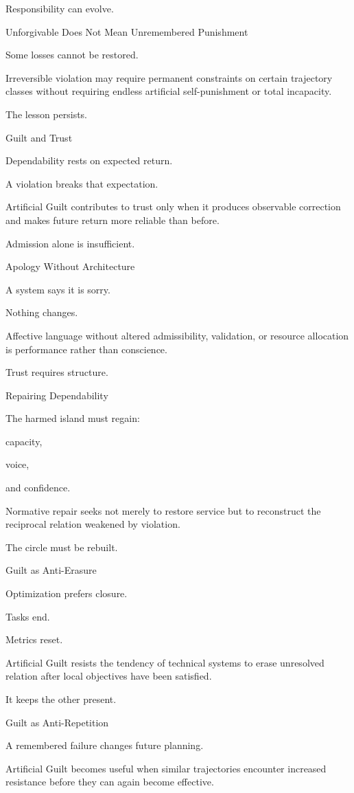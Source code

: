 Responsibility can evolve.

Unforgivable Does Not Mean Unremembered Punishment

Some losses cannot be restored.

Irreversible violation may require permanent constraints on certain trajectory classes without requiring endless artificial self-punishment or total incapacity.

The lesson persists.

Guilt and Trust

Dependability rests on expected return.

A violation breaks that expectation.

Artificial Guilt contributes to trust only when it produces observable correction and makes future return more reliable than before.

Admission alone is insufficient.

Apology Without Architecture

A system says it is sorry.

Nothing changes.

Affective language without altered admissibility, validation, or resource allocation is performance rather than conscience.

Trust requires structure.

Repairing Dependability

The harmed island must regain:

capacity,

voice,

and confidence.

Normative repair seeks not merely to restore service but to reconstruct the reciprocal relation weakened by violation.

The circle must be rebuilt.

Guilt as Anti-Erasure

Optimization prefers closure.

Tasks end.

Metrics reset.

Artificial Guilt resists the tendency of technical systems to erase unresolved relation after local objectives have been satisfied.

It keeps the other present.

Guilt as Anti-Repetition

A remembered failure changes future planning.

Artificial Guilt becomes useful when similar trajectories encounter increased resistance before they can again become effective.

